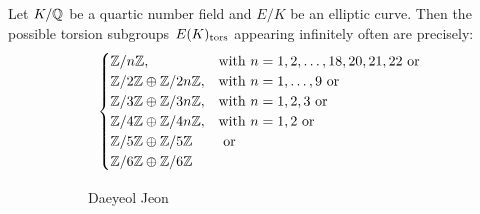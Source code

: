 \begin{frame}[plain]
\begin{thm}
Let $K/\mathbb{Q}$ be a quartic number field and $E/K$ be an elliptic curve. Then the possible torsion subgroups $E(K)_{\text{tors}}$ appearing infinitely often are precisely:
	\[
	\begin{cases}
	\mathbb{Z}/n\mathbb{Z}, & \text{with } n=1,2,\ldots,18,20,21,22 \text{ or} \\
	\mathbb{Z}/2\mathbb{Z} \oplus \mathbb{Z}/2n\mathbb{Z}, & \text{with } n=1,\ldots,9 \text{ or} \\
	\mathbb{Z}/3\mathbb{Z} \oplus \mathbb{Z}/3n\mathbb{Z}, & \text{with } n=1,2,3 \text{ or} \\
	\mathbb{Z}/4\mathbb{Z} \oplus \mathbb{Z}/4n\mathbb{Z}, & \text{with } n=1,2 \text{ or} \\
	\mathbb{Z}/5\mathbb{Z} \oplus \mathbb{Z}/5\mathbb{Z} & \text{ or} \\
	\mathbb{Z}/6\mathbb{Z} \oplus \mathbb{Z}/6\mathbb{Z}
	\end{cases}
	\]
\end{thm}
	\begin{figure}[h]
	\centering
	\begin{subfigure}{0.3\textwidth}
	\captionsetup{labelformat=empty}
	\centering
	\caption{\hspace{0.1cm}Daeyeol Jeon}
	\end{subfigure}
	\begin{subfigure}{0.3\textwidth}
	\captionsetup{labelformat=empty}
	\centering

\end{subfigure}
\end{figure}
\end{frame}
